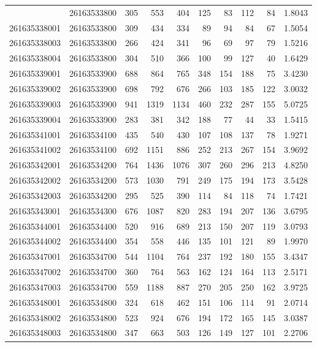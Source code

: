 \documentclass[
  11pt,
]{article}
\begin{document}
\begin{longtable}[t]{llrrrrrrrr}
\endfoot
\bottomrule
\endlastfoot
261635338002 & 26163533800 & 305 & 553 & 404 & 125 & 83 & 112 & 84 & 1.8043\\
261635338001 & 26163533800 & 309 & 434 & 334 & 89 & 94 & 84 & 67 & 1.5054\\
261635338003 & 26163533800 & 266 & 424 & 341 & 96 & 69 & 97 & 79 & 1.5216\\
261635338004 & 26163533800 & 304 & 510 & 366 & 100 & 99 & 127 & 40 & 1.6429\\
261635339001 & 26163533900 & 688 & 864 & 765 & 348 & 154 & 188 & 75 & 3.4230\\
261635339002 & 26163533900 & 698 & 792 & 676 & 266 & 103 & 185 & 122 & 3.0032\\
261635339003 & 26163533900 & 941 & 1319 & 1134 & 460 & 232 & 287 & 155 & 5.0725\\
261635339004 & 26163533900 & 283 & 381 & 342 & 188 & 77 & 44 & 33 & 1.5415\\
261635341001 & 26163534100 & 435 & 540 & 430 & 107 & 108 & 137 & 78 & 1.9271\\
261635341002 & 26163534100 & 692 & 1151 & 886 & 252 & 213 & 267 & 154 & 3.9692\\
261635342001 & 26163534200 & 764 & 1436 & 1076 & 307 & 260 & 296 & 213 & 4.8250\\
261635342002 & 26163534200 & 573 & 1030 & 791 & 249 & 175 & 194 & 173 & 3.5428\\
261635342003 & 26163534200 & 295 & 525 & 390 & 114 & 84 & 118 & 74 & 1.7421\\
261635343001 & 26163534300 & 676 & 1087 & 820 & 283 & 194 & 207 & 136 & 3.6795\\
261635344001 & 26163534400 & 520 & 916 & 689 & 213 & 150 & 207 & 119 & 3.0793\\
261635344002 & 26163534400 & 354 & 558 & 446 & 135 & 101 & 121 & 89 & 1.9970\\
261635347001 & 26163534700 & 544 & 1104 & 764 & 237 & 192 & 180 & 155 & 3.4347\\
261635347002 & 26163534700 & 360 & 764 & 563 & 162 & 124 & 164 & 113 & 2.5171\\
261635347003 & 26163534700 & 559 & 1188 & 887 & 270 & 205 & 250 & 162 & 3.9725\\
261635348001 & 26163534800 & 324 & 618 & 462 & 151 & 106 & 114 & 91 & 2.0714\\
261635348002 & 26163534800 & 523 & 924 & 676 & 194 & 172 & 165 & 145 & 3.0387\\
261635348003 & 26163534800 & 347 & 663 & 503 & 126 & 149 & 127 & 101 & 2.2706\\

\end{longtable}
\end{document}
